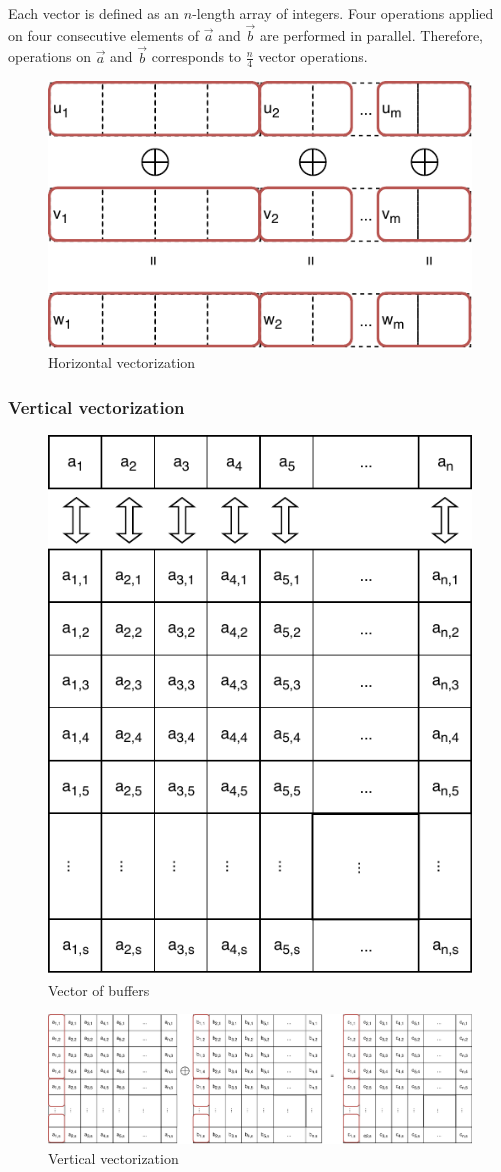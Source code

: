 \documentclass[oneside,9pt]{article}
\begin{document}
Each vector is defined as an $n$-length array of integers. Four operations applied on four consecutive elements of $\vec{a}$ and $\vec{b}$ are performed in parallel. Therefore,  operations on $\vec{a}$ and $\vec{b}$ corresponds to $\frac{n}{4}$ vector operations.

\begin{figure}[!ht]
\centering
\includegraphics[width=0.5\columnwidth]{vec_horizontal.pdf}
\caption{Horizontal vectorization}
\label{fig:vec_horizontal}
\end{figure}


\subsubsection{Vertical vectorization}

\begin{figure}[!ht]
\centering
\includegraphics[width=0.5\columnwidth]{vec_buffers.pdf}
\caption{Vector of buffers}
\label{fig:vec_buffers}
\end{figure}

\begin{figure}[!ht]
\includegraphics[width=\textwidth]{vec_vertical.pdf}
\caption{Vertical vectorization}
\label{fig:vec_vertical}
\end{figure}
\end{document}

